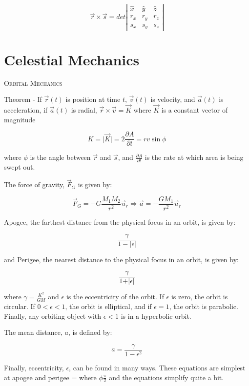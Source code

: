 \documentclass{article}
\begin{document}
\[
\vec{r} \times \vec{s} = det \left| \begin{array}{ccc}
\hat{x} & \hat{y} & \hat{z} \\
r_x & r_y & r_z \\
s_x & s_y & s_z
\end{array} \right|
\]

\bigskip

\section{Celestial Mechanics}

\textsc{Orbital Mechanics}

Theorem - If $\vec{r}(t)$ is position at time $t$, $\vec{v}(t)$ is velocity, and $\vec{a}(t)$ is acceleration, if $\vec{a}(t)$ is radial, $\vec{r} \times \vec{v} = \vec{K}$ where $\vec{K}$ is a constant vector of magnitude 

\[
K = \lvert \vec{K} \rvert = 2\frac{\partial{A}}{\partial{t}} = rv\sin{\phi}
\]

where $\phi$ is the angle between $\vec{r}$ and $\vec{s}$, and $\frac{\partial{A}}{\partial{t}}$ is the rate at which area is being swept out.


The force of gravity, $\vec{F}_G$ is given by:

\[
\vec{F}_G = -G\frac{M_1M_2}{r^2}\vec{u}_r \Rightarrow \vec{a} = -\frac{GM_1}{r^2}\vec{u}_r
\]

Apogee, the farthest distance from the physical focus in an orbit, is given by:

\[
\frac{\gamma}{1 - \lvert \epsilon \rvert}
\]

and Perigee, the nearest distance to the physical focus in an orbit, is given by:

\[
\frac{\gamma}{1 + \vert \epsilon \rvert}
\]

where $\gamma = \frac{K^2}{GM}$ and $\epsilon$ is the eccentricity of the orbit.  If $\epsilon$ is zero, the orbit is circular.  If $0 < \epsilon < 1$, the orbit is elliptical, and if $\epsilon = 1$, the orbit is parabolic.  Finally, any orbiting object with $\epsilon < 1$ is in a hyperbolic orbit.

The mean distance, $a$, is defined by:

\[
a = \frac{\gamma}{1 - \epsilon^2}
\]

Finally, eccentricity, $\epsilon$, can be found in many ways.  These equations are simplest at apogee and perigee  = where $\phi\frac{\pi}{2}$ and the equations simplify quite a bit.
\end{document}
